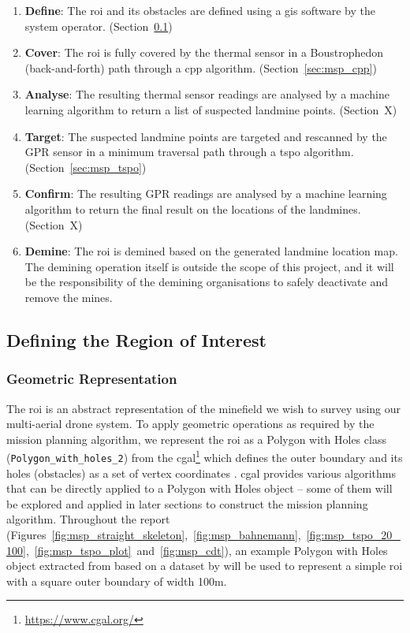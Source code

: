 \begin{enumerate}
    \item \textbf{Define}: The \gls{roi} and its obstacles are defined using a \gls{gis} software by the system operator. (Section~\ref{sec:msp_define})
    \item \textbf{Cover}: The \gls{roi} is fully covered by the thermal sensor in a Boustrophedon (back-and-forth) path through a \gls{cpp} algorithm. (Section~\ref{sec:msp_cpp})
    \item \textbf{Analyse}: The resulting thermal sensor readings are analysed by a machine learning algorithm to return a list of suspected landmine points. (Section~X) 
    \item \textbf{Target}: The suspected landmine points are targeted and rescanned by the \gls{GPR} sensor in a minimum traversal path through a \gls{tspo} algorithm. (Section~\ref{sec:msp_tspo}) 
    \item \textbf{Confirm}: The resulting \gls{GPR} readings are analysed by a machine learning algorithm to return the final result on the locations of the landmines. (Section~X)
    \item \textbf{Demine}: The \gls{roi} is demined based on the generated landmine location map. The demining operation itself is outside the scope of this project, and it will be the responsibility of the demining organisations to safely deactivate and remove the mines.
\end{enumerate}


\subsection{Defining the Region of Interest}
\label{sec:msp_define}

\subsubsection{Geometric Representation}

The \gls{roi} is an abstract representation of the minefield we wish to survey using our multi-aerial drone system. To apply geometric operations as required by the mission planning algorithm, we represent the \gls{roi} as a Polygon with Holes class (\texttt{Polygon\_with\_holes\_2}) from the \gls{cgal}\footnote{\url{https://www.cgal.org/}} which defines the outer boundary and its holes (obstacles) as a set of vertex coordinates \cite{cgal2024pwh}. \gls{cgal} provides various algorithms that can be directly applied to a Polygon with Holes object -- some of them will be explored and applied in later sections to construct the mission planning algorithm. Throughout the report (Figures~\ref{fig:msp_straight_skeleton},~\ref{fig:msp_bahnemann},~\ref{fig:msp_tspo_20_100},~\ref{fig:msp_tspo_plot}~and~\ref{fig:msp_cdt}), an example Polygon with Holes object extracted from \cite{bahnemann2021cpp} based on a dataset by \cite{sun2014dataset} will be used to represent a simple \gls{roi} with a square outer boundary of width 100m. 

